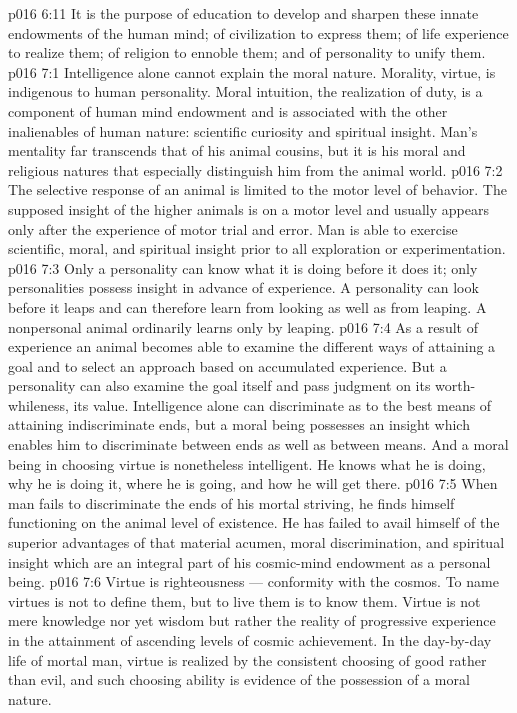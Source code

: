 \vs p016 6:11 It is the purpose of education to develop and sharpen these innate endowments of the human mind; of civilization to express them; of life experience to realize them; of religion to ennoble them; and of personality to unify them.
\vs p016 7:1 Intelligence alone cannot explain the moral nature. Morality, virtue, is indigenous to human personality. Moral intuition, the realization of duty, is a component of human mind endowment and is associated with the other inalienables of human nature: scientific curiosity and spiritual insight. Man’s mentality far transcends that of his animal cousins, but it is his moral and religious natures that especially distinguish him from the animal world.
\vs p016 7:2 The selective response of an animal is limited to the motor level of behavior. The supposed insight of the higher animals is on a motor level and usually appears only after the experience of motor trial and error. Man is able to exercise scientific, moral, and spiritual insight prior to all exploration or experimentation.
\vs p016 7:3 Only a personality can know what it is doing before it does it; only personalities possess insight in advance of experience. A personality can look before it leaps and can therefore learn from looking as well as from leaping. A nonpersonal animal ordinarily learns only by leaping.
\vs p016 7:4 As a result of experience an animal becomes able to examine the different ways of attaining a goal and to select an approach based on accumulated experience. But a personality can also examine the goal itself and pass judgment on its worth\hyp{}whileness, its value. Intelligence alone can discriminate as to the best means of attaining indiscriminate ends, but a moral being possesses an insight which enables him to discriminate between ends as well as between means. And a moral being in choosing virtue is nonetheless intelligent. He knows what he is doing, why he is doing it, where he is going, and how he will get there.
\vs p016 7:5 When man fails to discriminate the ends of his mortal striving, he finds himself functioning on the animal level of existence. He has failed to avail himself of the superior advantages of that material acumen, moral discrimination, and spiritual insight which are an integral part of his cosmic\hyp{}mind endowment as a personal being.
\vs p016 7:6 \pc Virtue is righteousness --- conformity with the cosmos. To name virtues is not to define them, but to live them is to know them. Virtue is not mere knowledge nor yet wisdom but rather the reality of progressive experience in the attainment of ascending levels of cosmic achievement. In the day\hyp{}by\hyp{}day life of mortal man, virtue is realized by the consistent choosing of good rather than evil, and such choosing ability is evidence of the possession of a moral nature.
